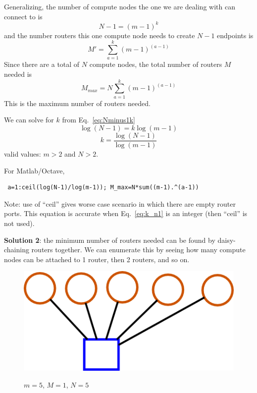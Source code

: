 \documentclass[pdftex]{article}
\begin{document}
Generalizing, the number of compute nodes the one we are dealing with can connect to is
\begin{equation}
 N-1=(m-1)^k
 \label{eq:Nminus1k}
\end{equation}
and the number routers this one compute node needs to create $N-1$ endpoints is
\begin{equation}
 M'=\sum_{a=1}^{k} (m-1)^{(a-1)}
\end{equation}
Since there are a total of $N$ compute nodes, the total number of routers $M$ needed is
\begin{equation}
\boxed{
 M_{max}=N\sum_{a=1}^{k} (m-1)^{(a-1)}
 }
\end{equation}
This is the maximum number of routers needed.

We can solve for $k$ from Eq.~\ref{eq:Nminus1k}
\begin{equation}
 \log(N-1)=k\log(m-1)
\end{equation}
\begin{equation}
 k=\frac{\log(N-1)}{\log(m-1)}
 \label{eq:k_n1}
\end{equation}
valid values: $m>2$ and $N>2$.

For Matlab/Octave,
\begin{verbatim}
 a=1:ceil(log(N-1)/log(m-1)); M_max=N*sum((m-1).^(a-1))
\end{verbatim}
Note: use of ``ceil'' gives worse case scenario in which there are empty router ports. This equation is accurate when Eq.~\ref{eq:k_n1} is an integer (then ``ceil'' is not used).

\textbf{Solution 2}: the minimum number of routers needed can be found by daisy-chaining routers together. We can enumerate this by seeing how many compute nodes can be attached to 1 router, then 2 routers, and so on. 

\begin{figure}[h!]
\begin{center}
\includegraphics[scale=0.3]{pictures/N5_n1_M1_m5}
\label{fig:neq15}
 \caption{$m=5$, $M=1$, $N=5$}
\end{center}
\end{figure}
\end{document}
